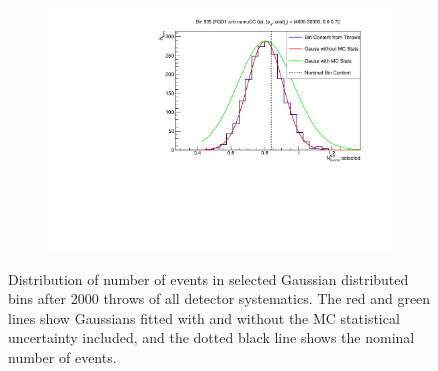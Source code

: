 \begin{figure}
\begin{subfigure}{.49\textwidth}
\end{subfigure}
\begin{subfigure}{.49\textwidth}
  \centering
  \includegraphics[width=0.95\linewidth]{figs/detbin_allsysts535}
\end{subfigure}
\caption{Distribution of number of events in selected Gaussian distributed bins after 2000 throws of all detector systematics. The red and green lines show Gaussians fitted with and without the MC statistical uncertainty included, and the dotted black line shows the nominal number of events.}
\label{fig:detgaussbins}
\end{figure}

